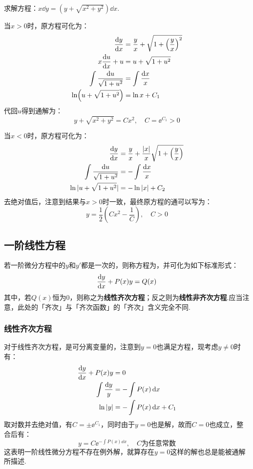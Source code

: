 \begin{question}
    求解方程：$x\dd{y} = (y + \sqrt{x^2+y^2})\dd{x}$.
\end{question}

\begin{solution}
    当$x>0$时，原方程可化为：
    \begin{align*}
        \dv{y}{x} &= \frac{y}{x} + \sqrt{1+\left(\frac{y}{x}\right)^2}\\
        x\dv{u}{x} + u &= u + \sqrt{1+u^2}\\
        \int\frac{\dd{u}}{\sqrt{1+u^2}} &= \int\frac{\dd{x}}{x}\\
        \ln(u+\sqrt{1+u^2}) &= \ln x + C_1
    \end{align*}
    代回$u$得到通解为：
    \[y + \sqrt{x^2+y^2} = Cx^2,\quad C=\ee^{C_1}>0\]

    当$x<0$时，原方程可化为：
    \begin{align*}
        \dv{y}{x} &= \frac{y}{x} + \frac{|x|}{x}\sqrt{1+\left(\frac{y}{x}\right)}\\
        \int\frac{\dd{u}}{\sqrt{1+u^2}} &= -\int\frac{\dd{x}}{x}\\
        \ln|u+\sqrt{1+u^2}| &= -\ln|x| + C_2
    \end{align*}
    去绝对值后，注意到结果与$x>0$时一致，最终原方程的通可以写为：
    \[y = \frac{1}{2}\left(Cx^2 - \frac{1}{C}\right),\quad C>0\]
\end{solution}


\subsection{一阶线性方程}
\begin{definition}
    若一阶微分方程中的$y$和$y'$都是一次的，则称方程为，并可化为如下标准形式：
    \[\dv{y}{x} + P(x)y = Q(x)\]
    其中，若$Q(x)$恒为$0$，则称之为\textbf{线性齐次方程}；反之则为\textbf{线性非齐次方程}.应当注意，此处的「齐次」与「齐次函数」的「齐次」含义完全不同.
\end{definition}
\subsubsection{线性齐次方程}
对于线性齐次方程，是可分离变量的，注意到$y=0$也满足方程，现考虑$y \neq 0$时有：
\begin{align*}
    \dv{y}{x} + P(x)y &= 0\\
    \int\frac{\dd{y}}{y} &= -\int P(x)\dd{x}\\
    \ln|y| &= -\int P(x)\dd{x} + C_1
\end{align*}
取对数并去绝对值，有$C=\pm\ee^{C_1}$，同时由于$y=0$也是解，故而$C=0$也成立，整合后有：
\[y = C \ee^{-\int P(x)\dd{x}},\quad C\text{为任意常数}\]
这表明一阶线性微分方程不存在例外解，就算存在$y=0$这样的解也总是能被通解所描述.


